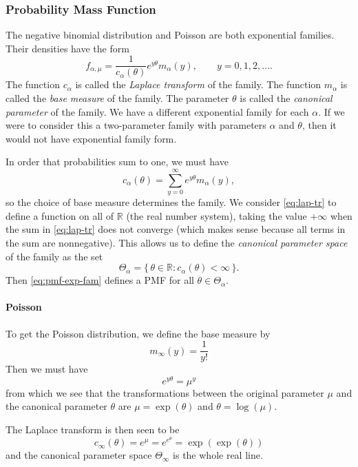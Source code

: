 \documentclass[11pt]{article}
\newcommand{\real}{\mathbb{R}}
\newcommand{\set}[1]{\{\, #1 \,\}}
\begin{document}
\subsubsection{Probability Mass Function}

The negative binomial distribution and Poisson are both exponential families.
Their densities have the form
\begin{equation} \label{eq:pmf-exp-fam}
   f_{\alpha, \mu} = \frac{1}{c_\alpha(\theta)} e^{y \theta} m_\alpha(y),
   \qquad y = 0, 1, 2, \ldots.
\end{equation}
The function
$c_\alpha$ is called the \emph{Laplace transform} of the family.
The function $m_\alpha$ is called the \emph{base measure} of the family.
The parameter $\theta$ is called the \emph{canonical parameter} of the
family.  We have a different exponential family for each $\alpha$.
If we were to consider this a two-parameter family with parameters
$\alpha$ and $\theta$, then it would not have exponential family form.

In order that probabilities sum to one, we must have
\begin{equation} \label{eq:lap-tr}
   c_\alpha(\theta) = \sum_{y = 0}^\infty e^{y \theta} m_\alpha(y),
\end{equation}
so the choice of base measure determines the family.
We consider \eqref{eq:lap-tr} to define a function on all of $\real$
(the real number system), taking the value $+ \infty$ when the sum in
\eqref{eq:lap-tr} does not converge (which makes sense because all terms
in the sum are nonnegative).  This allows us to define the
\emph{canonical parameter space} of the family as the set
$$
   \Theta_\alpha = \set{ \theta \in \real : c_\alpha(\theta) < \infty }.
$$
Then \eqref{eq:pmf-exp-fam} defines a PMF for all $\theta \in \Theta_\alpha$.

\paragraph{Poisson}

To get the Poisson distribution, we define the base measure by
$$
   m_\infty(y) = \frac{1}{y !}
$$
Then we must have
$$
   e^{y \theta} = \mu^y
$$
from which we see that the transformations between the original parameter
$\mu$ and the canonical parameter $\theta$ are $\mu = \exp(\theta)$ and
$\theta = \log(\mu)$.

The Laplace transform is then seen to be
$$
   c_\infty(\theta) = e^\mu = e^{e^\theta} = \exp(\exp(\theta))
$$
and the canonical parameter space $\Theta_\infty$ is the whole
real line.
\end{document}

